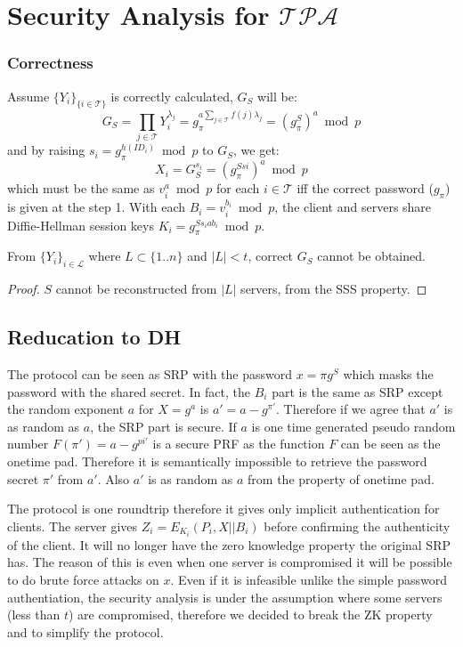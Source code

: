 \section{Security Analysis for $\mathcal{TPA}$}
\label{tpa}
\subsubsection*{Correctness}
Assume $\{Y_i\}_{\{i \in \mathcal{T}\}}$ is correctly calculated,
$G_S$ will be:
\[
  G_S = \prod_{j \in \mathcal{T}}Y_i^{\lambda_j} = g_{\pi}^{a \sum_{j
      \in \mathcal{T}} f(j) \lambda_j} = (g_{\pi}^S)^a \bmod p
\]
and by raising $s_i = g_{\pi}^{h(ID_i)} \bmod p$ to $G_S$, we get:
\[
  X_i = G_S^{s_i} = (g_{\pi}^{Ssi})^a \bmod p
\]
which must be the same as $v_i^a \bmod p$ for each $i \in
\mathcal{T}$ iff the correct password ($g_{\pi}$) is given at the
step 1. With each $B_i = v_i^{b_i} \bmod p$, the client and servers
share Diffie-Hellman session keys $K_i = g_{\pi}^{Ss_iab_i} \bmod p$.

\begin{lemma}
\label{tpa1}
From $\{Y_i\}_{i \in \mathcal{L}}$ where $L \subset \{1..n\}$ and $|L| <
t$, correct $G_S$ cannot be obtained.
\end{lemma}

\begin{proof}
$S$ cannot be reconstructed from $|L|$ servers, from the SSS
  property.
\end{proof}

\subsection{Reducation to DH}

The protocol can be seen as SRP with the password $x = \pi g^S$ which
masks the password with the shared secret. In fact, the $B_i$ part is
the same as SRP except the random exponent $a$ for $X = g^a$ is $a' =
a - g^{\pi'}$. Therefore if we agree that $a'$ is as random as $a$,
the SRP part is secure. If $a$ is one time generated pseudo random
number $F(\pi') = a - g^{pi'}$ is a secure PRF as the function $F$ can
be seen as the onetime pad. Therefore it is semantically impossible to
retrieve the password secret $\pi'$ from $a'$. Also $a'$ is as random
as $a$ from the property of onetime pad.

The protocol is one roundtrip therefore it gives only implicit
authentication for clients. The server gives $Z_i = E_{K_i}(P_i,
X||B_i)$ before confirming the authenticity of the client. It will 
no longer have the zero knowledge property the original SRP has. The
reason of this is even when one server is compromised it will be
possible to do brute force attacks on $x$. Even if it is
infeasible unlike the simple password authentiation, the security
analysis is under the assumption where some servers (less than $t$)
are compromised, therefore we decided to break the ZK property and to
simplify the protocol.

